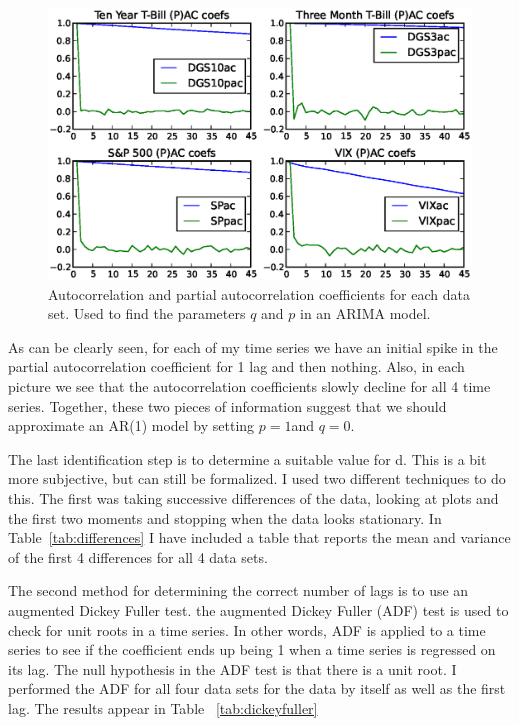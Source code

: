 \documentclass[a4paper, 11pt]{article}
\theoremstyle{definition} %
\numberwithin{equation}{section}
\begin{document}
      \begin{figure}[!h]
          \centering
          \includegraphics[width=6in]{./Figures/all_corrs.eps}
          \captionsetup{width=5.5in}
          \caption{\small Autocorrelation and partial autocorrelation coefficients for each data set. Used to find the parameters $q$ and $p$ in an ARIMA model.}
          \label{fig:correlations}
      \end{figure}

      As can be clearly seen, for each of my time series we have an initial spike in the partial autocorrelation coefficient for 1 lag and then nothing. Also, in each picture we see that the autocorrelation coefficients slowly decline for all 4 time series. Together, these two pieces of information suggest that we should approximate an AR(1) model by setting $p = 1 $and $q = 0$.

      The last identification step is to determine a suitable value for d. This is a bit more subjective, but can still be formalized. I used two different techniques to do this. The first was taking successive differences of the data, looking at plots and the first two moments and stopping when the data looks stationary.  In Table~\ref{tab:differences} I have included a table that reports the mean and variance of the first 4 differences for all 4 data sets.

      The second method for determining the correct number of lags is to use an augmented Dickey Fuller test.  the augmented Dickey Fuller (ADF) test is used to check for unit roots in a time series. In other words, ADF is applied to a time series to see if the coefficient ends up being 1 when a time series is regressed on its lag. The null hypothesis in the ADF test is that there is a unit root. I performed the ADF for all four data sets for the data by itself as well as the first lag. The results appear in Table ~\ref{tab:dickeyfuller}
\end{document}
